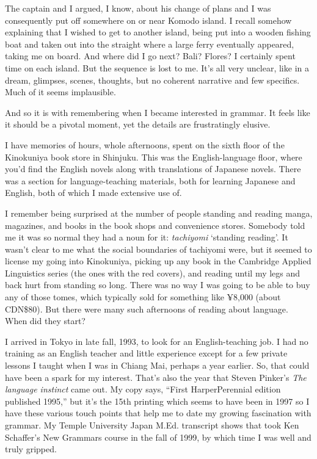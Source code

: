 The captain and I argued, I know, about his change of plans and I was consequently put off somewhere on or near Komodo island. I recall somehow explaining that I wished to get to another island, being put into a wooden fishing boat and taken out into the straight where a large ferry eventually appeared, taking me on board. And where did I go next? Bali? Flores? I certainly spent time on each island. But the sequence is lost to me. It's all very unclear, like in a dream, glimpses, scenes, thoughts, but no coherent narrative and few specifics. Much of it seems implausible.

And so it is with remembering when I became interested in grammar. It feels like it should be a pivotal moment, yet the details are frustratingly elusive.

\bigskip

I have memories of hours, whole afternoons, spent on the sixth floor of the Kinokuniya book store in Shinjuku. This was the English-language floor, where you'd find the English novels along with translations of Japanese novels. There was a section for language-teaching materials, both for learning Japanese and English, both of which I made extensive use of.

I remember being surprised at the number of people standing and reading manga, magazines, and books in the book shops and convenience stores. Somebody told me it was so normal they had a noun for it: \textit{tachiyomi} `standing reading'. It wasn't clear to me what the social boundaries of tachiyomi were, but it seemed to license my going into Kinokuniya, picking up any book in the Cambridge Applied Linguistics series (the ones with the red covers), and reading until my legs and back hurt from standing so long. There was no way I was going to be able to buy any of those tomes, which typically sold for something like ¥8,000 (about CDN\$80). But there were many such afternoons of reading about language. When did they start?

\bigskip

I arrived in Tokyo in late fall, 1993, to look for an English-teaching job. I had no training as an English teacher and little experience except for a few private lessons I taught when I was in Chiang Mai, perhaps a year earlier. So, that could have been a spark for my interest. That's also the year that Steven Pinker's \textit{The language instinct} came out. My copy says, ``First HarperPerennial edition published 1995,'' but it's the 15th printing which seems to have been in 1997 so I have these various touch points that help me to date my growing fascination with grammar. My Temple University Japan M.Ed. transcript shows that took Ken Schaffer's New Grammars course in the fall of 1999, by which time I was well and truly gripped.

